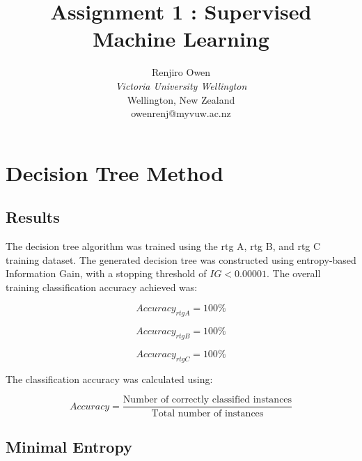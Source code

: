 \documentclass[a4paper,12pt]{article}
\begin{document}
\title{Assignment 1 : Supervised Machine Learning %
}

\author{Renjiro Owen\\
\textit{Victoria University Wellington}\\
Wellington, New Zealand\\
owenrenj@myvuw.ac.nz}

\maketitle

\section{Decision Tree Method}

\subsection{Results}

The decision tree algorithm was trained using the rtg A, rtg B, and rtg C training dataset. 
The generated decision tree was constructed using entropy-based Information Gain, 
with a stopping threshold of $IG < 0.00001$.
The overall training classification accuracy achieved was:

\begin{equation}
	Accuracy_{rtgA} = \text{100}\%
\end{equation}

\begin{equation}
	Accuracy_{rtgB} = \text{100}\%
\end{equation}

\begin{equation}
	Accuracy_{rtgC} = \text{100}\%
\end{equation}

The classification accuracy was calculated using:

\begin{equation}
	Accuracy = \frac{\text{Number of correctly classified instances}}
	{\text{Total number of instances}}
\end{equation}

\subsection{Minimal Entropy}
\end{document}
